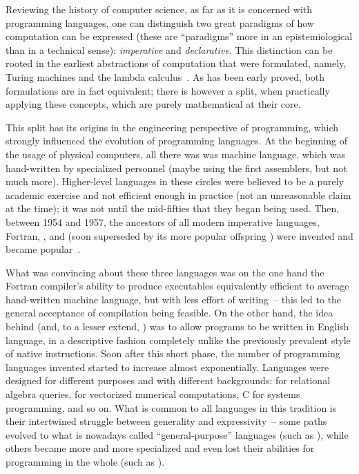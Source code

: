 Reviewing the history of computer science, as far as it is concerned with programming languages, one
can distinguish two great paradigms of how computation can be expressed (these are
\enquote{paradigms} more in an epistemiological than in a technical sense): \emph{imperative} and
\emph{declarative}. This distinction can be rooted in the earliest abstractions of computation that
were formulated, namely, Turing machines and the lambda calculus~\cite{valverde2015:punctuated}. As
has been early proved, both formulations are in fact equivalent; there is however a split, when
practically applying these concepts, which are purely mathematical at their core.

This split has its origins in the engineering perspective of programming, which strongly influenced
the evolution of programming languages. At the beginning of the usage of physical computers, all
there was was machine language, which was hand-written by specialized personnel (maybe using the
first assemblers, but not much more). Higher-level languages in these circles were believed to be a
purely academic exercise and not efficient enough in practice (not an unreasonable claim at the
time); it was not until the mid-fifties that they began being used. Then, between 1954 and 1957, the
ancestors of all modern imperative languages, Fortran, , and  (soon
superseded by its more popular offspring ) were invented and became
popular~\cite{sammet1972:programming}.

What was convincing about these three languages was on the one hand the Fortran compiler's ability
to produce executables equivalently efficient to average hand-written machine language, but with
less effort of writing~-- this led to the general acceptance of compilation being feasible. On the
other hand, the idea behind  (and, to a lesser extend, ) was
to allow programs to be written in English language, in a descriptive fashion completely unlike the
previously prevalent style of native instructions. Soon after this short phase, the number of
programming languages invented started to increase almost exponentially. Languages were designed for
different purposes and with different backgrounds:  for relational algebra queries,
 for vectorized numerical computations, C for systems programming, and so on. What is
common to all languages in this tradition is their intertwined struggle between generality and
expressivity~-- some paths evolved to what is nowadays called \enquote{general-purpose} languages
(such as \CC), while others became more and more specialized and even lost their abilities for
programming in the whole (such as ).

